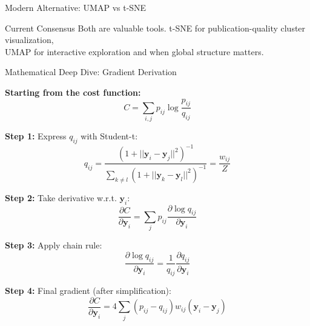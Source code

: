 \documentclass[10pt]{beamer}
\begin{document}
\begin{frame}{Modern Alternative: UMAP vs t-SNE}
\vspace{0.15cm}
\begin{alertblock}{Current Consensus}
\footnotesize
Both are valuable tools. t-SNE for publication-quality cluster visualization,\\
UMAP for interactive exploration and when global structure matters.
\end{alertblock}

\end{frame}

\begin{frame}{Mathematical Deep Dive: Gradient Derivation}

\textbf{Starting from the cost function:}
\begin{equation}
C = \sum_{i,j} p_{ij} \log \frac{p_{ij}}{q_{ij}}
\end{equation}

\textbf{Step 1:} Express $q_{ij}$ with Student-t:
\begin{equation}
q_{ij} = \frac{(1 + ||\mathbf{y}_i - \mathbf{y}_j||^2)^{-1}}{\sum_{k \neq l} (1 + ||\mathbf{y}_k - \mathbf{y}_l||^2)^{-1}} = \frac{w_{ij}}{Z}
\end{equation}

\textbf{Step 2:} Take derivative w.r.t. $\mathbf{y}_i$:
\begin{equation}
\frac{\partial C}{\partial \mathbf{y}_i} = \sum_j p_{ij} \frac{\partial \log q_{ij}}{\partial \mathbf{y}_i}
\end{equation}

\textbf{Step 3:} Apply chain rule:
\begin{equation}
\frac{\partial \log q_{ij}}{\partial \mathbf{y}_i} = \frac{1}{q_{ij}} \frac{\partial q_{ij}}{\partial \mathbf{y}_i}
\end{equation}

\textbf{Step 4:} Final gradient (after simplification):
\begin{equation}
\frac{\partial C}{\partial \mathbf{y}_i} = 4 \sum_j (p_{ij} - q_{ij}) w_{ij} (\mathbf{y}_i - \mathbf{y}_j)
\end{equation}

\end{frame}
\end{document}
